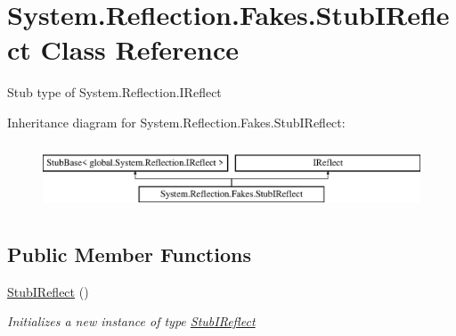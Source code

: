 \hypertarget{class_system_1_1_reflection_1_1_fakes_1_1_stub_i_reflect}{\section{System.\-Reflection.\-Fakes.\-Stub\-I\-Reflect Class Reference}
\label{class_system_1_1_reflection_1_1_fakes_1_1_stub_i_reflect}
}


Stub type of System.\-Reflection.\-I\-Reflect 


Inheritance diagram for System.\-Reflection.\-Fakes.\-Stub\-I\-Reflect\-:\begin{figure}[H]
\begin{center}
\leavevmode
\includegraphics[height=1.992882cm]{class_system_1_1_reflection_1_1_fakes_1_1_stub_i_reflect}
\end{center}
\end{figure}
\subsection*{Public Member Functions}
\begin{DoxyCompactItemize}
\item 
\hyperlink{class_system_1_1_reflection_1_1_fakes_1_1_stub_i_reflect_ae575035192a4726ed57e98b3589a578c}{Stub\-I\-Reflect} ()
\begin{DoxyCompactList}\small\item\em Initializes a new instance of type \hyperlink{class_system_1_1_reflection_1_1_fakes_1_1_stub_i_reflect}{Stub\-I\-Reflect}\end{DoxyCompactList}\end{DoxyCompactItemize}
